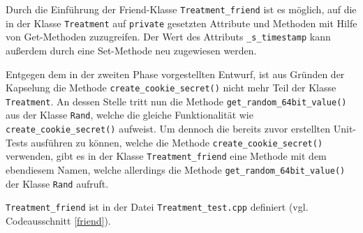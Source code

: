 \documentclass[../review_3.tex]{subfiles}
\begin{document}
Durch die Einführung der Friend-Klasse \texttt{Treatment\_friend} ist es möglich, auf die in der Klasse \texttt{Treatment} auf \texttt{private} gesetzten Attribute und Methoden mit Hilfe von Get-Methoden zuzugreifen. Der Wert des Attributs \texttt{\_s\_timestamp} kann außerdem durch eine Set-Methode neu zugewiesen werden.

Entgegen dem in der zweiten Phase vorgestellten Entwurf, ist aus Gründen der Kapselung die Methode \texttt{create\_cookie\_secret()}  nicht mehr Teil der Klasse \texttt{Treatment}. An dessen Stelle tritt nun die Methode \texttt{get\_random\_64bit\_value()} aus der Klasse \texttt{Rand}, welche die gleiche Funktionalität wie \texttt{create\_cookie\_secret()} aufweist. Um dennoch die bereits zuvor erstellten Unit-Tests ausführen zu können, welche die Methode \texttt{create\_cookie\_secret()} verwenden, gibt es in der Klasse \texttt{Treatment\_friend} eine Methode mit dem ebendiesem Namen, welche allerdings die Methode \texttt{get\_random\_64bit\_value()} der Klasse \texttt{Rand} aufruft.

\texttt{Treatment\_friend} ist in der Datei \texttt{Treatment\_test.cpp} definiert (vgl. Codeausschnitt \ref{friend}).
\end{document}
